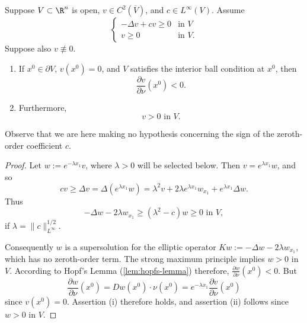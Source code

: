 \begin{lemma}
\label{lem:hopf-lemma-refinement}
Suppose $V \subset \R^n$ is open, $v \in C^2(\overline{V})$, and $c \in L^\infty(V)$. Assume
\[
\begin{cases} -\Delta v + cv \geq 0 & \text{in } V \\ v \geq 0 & \text{in } V. \end{cases}
\tag{4}
\]
Suppose also $v \not\equiv 0$.
\begin{enumerate}
\item[(i)] If $x^0 \in \partial V$, $v(x^0) = 0$, and $V$ satisfies the interior ball condition at $x^0$, then
\[
\frac{\partial v}{\partial \nu}(x^0) < 0.
\tag{5}
\]
\item[(ii)] Furthermore,
\[
v > 0 \text{ in } V.
\tag{6}
\]
\end{enumerate}
Observe that we are here making no hypothesis concerning the sign of the zeroth-order coefficient $c$.
\end{lemma}
\begin{proof}
Let $w := e^{-\lambda x_1}v$, where $\lambda > 0$ will be selected below. Then $v = e^{\lambda x_1}w$, and so
\[
cv \geq \Delta v = \Delta(e^{\lambda x_1}w) = \lambda^2 v + 2\lambda e^{\lambda x_1}w_{x_1} + e^{\lambda x_1}\Delta w.
\]
Thus
\[
-\Delta w - 2\lambda w_{x_1} \geq (\lambda^2 - c)w \geq 0 \text{ in } V,
\]
if $\lambda = \|c\|_{L^\infty}^{1/2}$.

Consequently $w$ is a supersolution for the elliptic operator $Kw := -\Delta w - 2\lambda w_{x_1}$, which has no zeroth-order term. The strong maximum principle implies $w > 0$ in $V$. According to Hopf's Lemma (\cref{lem:hopfs-lemma}) therefore, $\frac{\partial w}{\partial \nu}(x^0) < 0$. But
\[
\frac{\partial w}{\partial \nu}(x^0) = Dw(x^0) \cdot \nu(x^0) = e^{-\lambda x_1} \frac{\partial v}{\partial \nu}(x^0)
\]
since $v(x^0) = 0$. Assertion (i) therefore holds, and assertion (ii) follows since $w > 0$ in $V$.
\end{proof}

